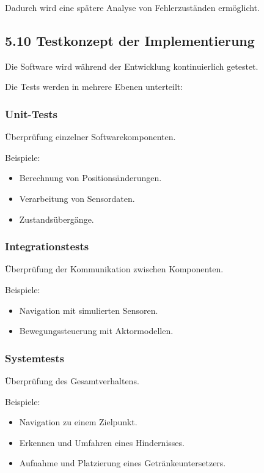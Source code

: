\documentclass[
]{article}
\providecommand{\tightlist}{%
  \setlength{\itemsep}{0pt}\setlength{\parskip}{0pt}}
\begin{document}
Dadurch wird eine spätere Analyse von Fehlerzuständen ermöglicht.

\subsection{5.10 Testkonzept der
Implementierung}\label{testkonzept-der-implementierung}

Die Software wird während der Entwicklung kontinuierlich getestet.

Die Tests werden in mehrere Ebenen unterteilt:

\subsubsection{Unit-Tests}\label{unit-tests}

Überprüfung einzelner Softwarekomponenten.

Beispiele:

\begin{itemize}
\tightlist
\item
  Berechnung von Positionsänderungen.
\item
  Verarbeitung von Sensordaten.
\item
  Zustandsübergänge.
\end{itemize}

\subsubsection{Integrationstests}\label{integrationstests}

Überprüfung der Kommunikation zwischen Komponenten.

Beispiele:

\begin{itemize}
\tightlist
\item
  Navigation mit simulierten Sensoren.
\item
  Bewegungssteuerung mit Aktormodellen.
\end{itemize}

\subsubsection{Systemtests}\label{systemtests}

Überprüfung des Gesamtverhaltens.

Beispiele:

\begin{itemize}
\tightlist
\item
  Navigation zu einem Zielpunkt.
\item
  Erkennen und Umfahren eines Hindernisses.
\item
  Aufnahme und Platzierung eines Getränkeuntersetzers.
\end{itemize}
\end{document}
